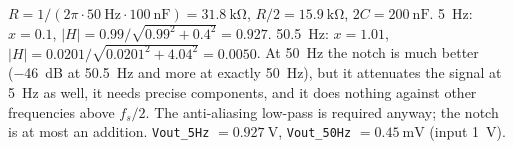 \begin{solution}
\begin{talist}
\ta $R = 1/(2\pi\cdot\SI{50}{\hertz}\cdot\SI{100}{\nano\farad}) = \SI{31.8}{\kilo\ohm}$, $R/2 = \SI{15.9}{\kilo\ohm}$, $2C = \SI{200}{\nano\farad}$.
\ta \SI{5}{\hertz}: $x = 0.1$, $|H| = 0.99/\sqrt{0.99^2 + 0.4^2} = 0.927$.
    \newline \SI{50.5}{\hertz}: $x = 1.01$, $|H| = 0.0201/\sqrt{0.0201^2+4.04^2} = 0.0050$.
\ta At \SI{50}{\hertz} the notch is much better (\SI{-46}{\deci\bel} at \SI{50.5}{\hertz} and more at exactly \SI{50}{\hertz}),
    but it attenuates the signal at \SI{5}{\hertz} as well, it needs precise components, and it does nothing against
    other frequencies above $f_s/2$. The anti-aliasing low-pass is required anyway; the notch is at most an addition.
\ta {}\newline \texttt{Vout\_5Hz} $= \SI{0.927}{\volt}$, \texttt{Vout\_50Hz} $= \SI{0.45}{\milli\volt}$ (input \SI{1}{\volt}).
\end{talist}
\end{solution}

